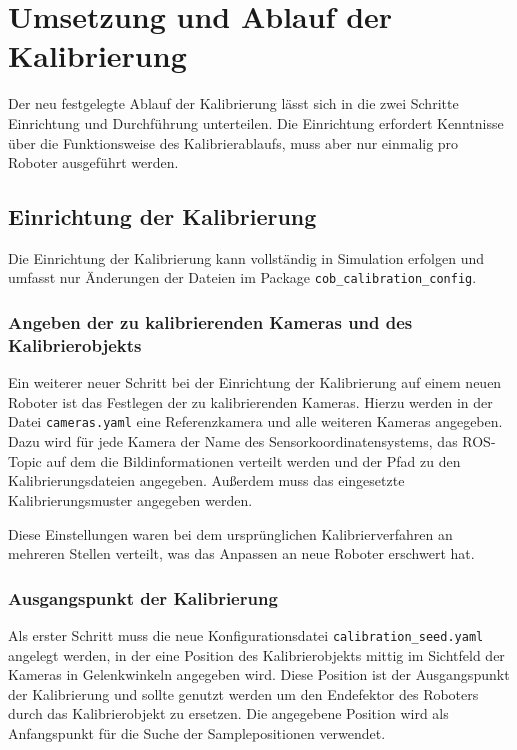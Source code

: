 \chapter{Umsetzung und Ablauf der Kalibrierung}

Der neu festgelegte Ablauf der Kalibrierung lässt sich in die zwei Schritte 
Einrichtung und Durchführung unterteilen. Die Einrichtung erfordert Kenntnisse
über die Funktionsweise des Kalibrierablaufs, muss aber nur einmalig pro Roboter
ausgeführt werden.

\section{Einrichtung der Kalibrierung}
\label{sec:Einrichtung der Kalibrierung}

Die Einrichtung der Kalibrierung kann vollständig in Simulation erfolgen und 
umfasst nur Änderungen der Dateien im Package \texttt{cob\_calibration\_config}. 


\subsection{Angeben der zu kalibrierenden Kameras und des Kalibrierobjekts}
\label{sub:Angeben der zu kalibrierenden Kameras}

Ein weiterer neuer Schritt bei der Einrichtung der Kalibrierung auf einem neuen
Roboter ist das Festlegen der zu kalibrierenden Kameras. Hierzu werden in der 
Datei \texttt{cameras.yaml} eine Referenzkamera und alle weiteren Kameras angegeben.
Dazu wird für jede Kamera der Name des Sensorkoordinatensystems, das
\ac{ROS}-Topic auf dem die Bildinformationen verteilt werden und der Pfad zu den
Kalibrierungsdateien angegeben. Außerdem muss das eingesetzte Kalibrierungsmuster
angegeben werden. 

Diese Einstellungen waren bei dem ursprünglichen Kalibrierverfahren an mehreren 
Stellen verteilt, was das Anpassen an neue Roboter erschwert hat.
\subsection{Ausgangspunkt der Kalibrierung}
\label{sub:Ausgangspunkt der Kalibrierung}

Als
erster Schritt muss die neue Konfigurationsdatei \texttt{calibration\_seed.yaml} 
angelegt werden, in der eine Position des Kalibrierobjekts mittig im Sichtfeld
der Kameras in Gelenkwinkeln angegeben wird. Diese Position ist der Ausgangspunkt
der Kalibrierung und sollte genutzt werden um den Endefektor des Roboters durch 
das Kalibrierobjekt zu ersetzen. Die angegebene Position wird als Anfangspunkt 
für die Suche der Samplepositionen verwendet.

